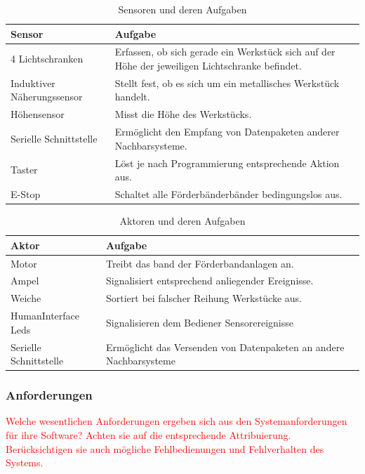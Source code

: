 \documentclass[a4paper, 11pt]{article}
\begin{document}
\begin{table}[h]
\center
\begin{tabularx}{\textwidth}{|l|X|}
\hline
\textbf{Sensor}&\textbf{Aufgabe}\\
\hline
4 Lichtschranken&Erfassen, ob sich gerade ein Werkstück sich auf der Höhe der jeweiligen Lichtschranke befindet.\\
\hline
Induktiver Näherungssensor&Stellt fest, ob es sich um ein metallisches Werkstück handelt.\\
\hline
Höhensensor&Misst die Höhe des Werkstücks.\\
\hline
Serielle Schnittstelle&Ermöglicht den Empfang von Datenpaketen anderer Nachbarsysteme.\\
\hline
Taster&Löst je nach Programmierung entsprechende Aktion aus.\\
\hline
E-Stop&Schaltet alle Förderbänderbänder bedingungslos aus.\\
\hline
\end{tabularx}
\caption{Sensoren und deren Aufgaben}
\label{senstasks}
\end{table}

\begin{table}[h]
\center
\begin{tabularx}{\textwidth}{|l|X|}
\hline
\textbf{Aktor}&\textbf{Aufgabe}\\
\hline
Motor&Treibt das band der Förderbandanlagen an.\\
\hline
Ampel&Signalisiert entsprechend anliegender Ereignisse.\\
\hline
Weiche&Sortiert bei falscher Reihung Werkstücke aus.\\
\hline
HumanInterface Leds&Signalisieren dem Bediener Sensorereignisse\\
\hline
Serielle Schnittstelle&Ermöglicht das Versenden von Datenpaketen an andere Nachbarsysteme\\
\hline
\end{tabularx}
\caption{Aktoren und deren Aufgaben}
\label{acttasks}
\end{table}

\newpage

\subsubsection{Anforderungen}
\textcolor{red}{Welche wesentlichen Anforderungen ergeben sich aus den Systemanforderungen für ihre Software? Achten sie auf die entsprechende Attribuierung. Berücksichtigen sie auch mögliche Fehlbedienungen und Fehlverhalten des Systems.}
\end{document}
